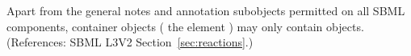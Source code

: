 Apart from the general notes and annotation subobjects permitted on all
SBML components, \ListOfModifierSpeciesReferences container objects (\ie
the \Reaction element ) may only contain
\ModifierSpeciesReference objects.  (References: SBML L3V2
Section~\ref{sec:reactions}.)
